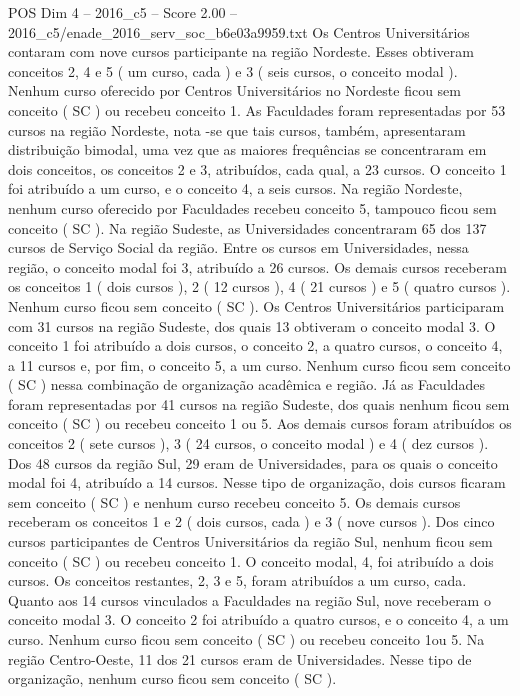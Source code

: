 \begin{textsample}{POS Dim 4 – 2016\_c5 – Score 2.00 – 2016\_c5/enade\_2016\_serv\_soc\_b6e03a9959.txt}
Os Centros Universitários contaram com nove cursos participante na região Nordeste.
Esses obtiveram conceitos 2, 4 e 5 ( um curso, cada ) e 3 ( seis cursos, o conceito modal ).
Nenhum curso oferecido por Centros Universitários no Nordeste ficou sem conceito ( SC ) ou recebeu conceito 1.
As Faculdades foram representadas por 53 cursos na região Nordeste, nota -se que tais cursos, também, apresentaram distribuição bimodal, uma vez que as maiores frequências se concentraram em dois conceitos, os conceitos 2 e 3, atribuídos, cada qual, a 23 cursos.
O conceito 1 foi atribuído a um curso, e o conceito 4, a seis cursos.
Na região Nordeste, nenhum curso oferecido por Faculdades recebeu conceito 5, tampouco ficou sem conceito ( SC ).
Na região Sudeste, as Universidades concentraram 65 dos 137 cursos de Serviço Social da região.
Entre os cursos em Universidades, nessa região, o conceito modal foi 3, atribuído a 26 cursos.
Os demais cursos receberam os conceitos 1 ( dois cursos ), 2 ( 12 cursos ), 4 ( 21 cursos ) e 5 ( quatro cursos ).
Nenhum curso ficou sem conceito ( SC ).
Os Centros Universitários participaram com 31 cursos na região Sudeste, dos quais 13 obtiveram o conceito modal 3.
O conceito 1 foi atribuído a dois cursos, o conceito 2, a quatro cursos, o conceito 4, a 11 cursos e, por fim, o conceito 5, a um curso.
Nenhum curso ficou sem conceito ( SC ) nessa combinação de organização acadêmica e região.
Já as Faculdades foram representadas por 41 cursos na região Sudeste, dos quais nenhum ficou sem conceito ( SC ) ou recebeu conceito 1 ou 5.
Aos demais cursos foram atribuídos os conceitos 2 ( sete cursos ), 3 ( 24 cursos, o conceito modal ) e 4 ( dez cursos ).
Dos 48 cursos da região Sul, 29 eram de Universidades, para os quais o conceito modal foi 4, atribuído a 14 cursos.
Nesse tipo de organização, dois cursos ficaram sem conceito ( SC ) e nenhum curso recebeu conceito 5.
Os demais cursos receberam os conceitos 1 e 2 ( dois cursos, cada ) e 3 ( nove cursos ).
Dos cinco cursos participantes de Centros Universitários da região Sul, nenhum ficou sem conceito ( SC ) ou recebeu conceito 1.
O conceito modal, 4, foi atribuído a dois cursos.
Os conceitos restantes, 2, 3 e 5, foram atribuídos a um curso, cada.
Quanto aos 14 cursos vinculados a Faculdades na região Sul, nove receberam o conceito modal 3.
O conceito 2 foi atribuído a quatro cursos, e o conceito 4, a um curso.
Nenhum curso ficou sem conceito ( SC ) ou recebeu conceito 1ou 5.
Na região Centro-Oeste, 11 dos 21 cursos eram de Universidades.
Nesse tipo de organização, nenhum curso ficou sem conceito ( SC ).

\end{textsample}
